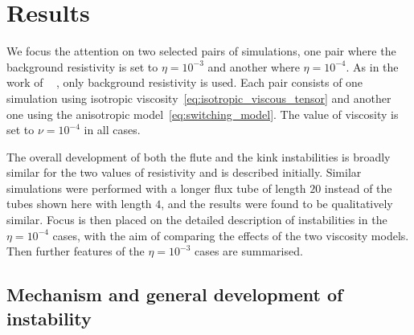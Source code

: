 \documentclass[fleqn,usenatbib]{mnras}
\newcommand{\revcite}[1]{{\color{red} \underline{#1}}}
\begin{document}
\section{Results}
\label{sec-results}

We focus the attention on two selected pairs of  simulations, one pair where
the background resistivity is set to $\eta=10^{-3}$ and another where
$\eta=10^{-4}$. As in the work of ~\revcite{\citet{quinnEffectAnisotropicViscosity2020}}, only
background resistivity is used. Each pair consists of one simulation using
isotropic viscosity~\eqref{eq:isotropic_viscous_tensor} and another one using
the anisotropic model~\eqref{eq:switching_model}. The value of viscosity is set
to $\nu = 10^{-4}$ in all cases. 

The overall development of both the flute and the kink instabilities is broadly
similar for the two values of resistivity and is described  initially. Similar
simulations were performed with a longer flux tube of length $20$ instead of
the tubes shown here with length $4$, and the results were found to be
qualitatively similar. Focus is then placed on the detailed description of
instabilities in the $\eta=10^{-4}$ cases, with the aim of comparing the
effects of the two viscosity models. Then further features of the
$\eta=10^{-3}$ cases are summarised.

\subsection{Mechanism and
    general development of instability}
\end{document}
